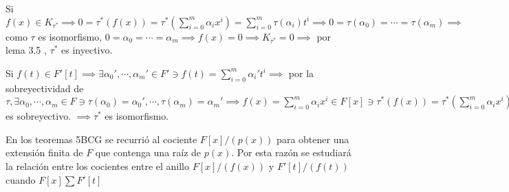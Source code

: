 \begin{lema}[5.3]
\begin{dem}
        Si $f(x)\in K_{\tau^*}\implies 0=\tau^*(f(x))=\tau^*\left(\sum_{i=0}^m \alpha_ix^i\right)=\sum_{i=0}^m \tau(\alpha_i)t^i \implies 0=\tau(\alpha_0)=\cdots =\tau(\alpha_m)\implies$ como $\tau$ es isomorfismo, $0=\alpha_0=\cdots=\alpha_m\implies f(x)=0\implies K_{\tau^*}=0\implies$ por lema 3.5 , $\tau^*$ es inyectivo. \bigbreak

        Si $f(t)\in F'[t]\implies\exists \alpha_0',\cdots,\alpha_m'\in F'\ni f(t)=\sum_{i=0}^m \alpha_i't^i\implies$ por la sobreyectividad de $\tau,\exists \alpha_0,\cdots,\alpha_m\in F\ni \tau(\alpha_0)=\alpha_0',\cdots, \tau(\alpha_m)=\alpha_m'\implies f(x)=\sum_{i=0}^m \alpha_i x^i \in F[x]\ni \tau ^*(f(x))=\tau^*(\sum_{i=0}^m\alpha_ix^i)=\sum_{i=0}^m \tau(\alpha_i')t^i=\sum_{i=0}^m \alpha_i't^i = f(t)\implies \tau^*$ es sobreyectivo. $\implies \tau ^*$ es isomorfismo.
    \end{dem} 
\end{lema}

\begin{cajita}
    \begin{nota}
        En los teoremas 5BCG se recurrió al cociente $F[x]/(p(x))$ para obtener una extensión finita de $F$ que contenga una raíz de $p(x)$. Por esta razón se estudiará la relación entre los cocientes entre el anillo $F[x]/(f(x))$ y $F'[t]/(f(t))$ cuando $F[x]\sum F'[t]$
    \end{nota}
\end{cajita}

